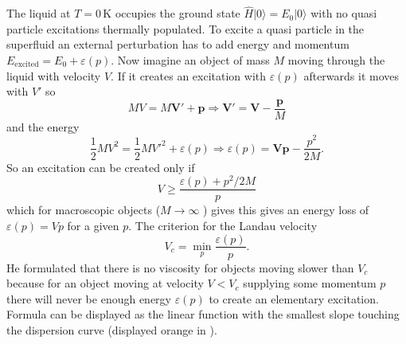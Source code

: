The liquid at $T = 0\, \mathrm{K}$ occupies the ground state $\hat H |0\rangle = E_0 |0\rangle$ with no quasi particle excitations thermally populated. To excite a quasi particle in the superfluid an external perturbation has to add energy and momentum $E_{\mathrm{excited}} = E_0 + \varepsilon(p)$. Now imagine an object of mass $M$ moving through the liquid with velocity $V$. If it creates an excitation with $\varepsilon(p)$ afterwards it moves with $V'$ so
\begin{equation}
    MV = M\mathbf V' + \mathbf p \Rightarrow \mathbf V' = \mathbf V -\frac{\mathbf p}{M}
\end{equation}
and the energy
\begin{equation}
    \frac{1}{2}MV^2 = \frac{1}{2}MV'^2 + \varepsilon(p) \Rightarrow \varepsilon(p) = \mathbf V\mathbf p - \frac{p^2}{2M}.
\end{equation}
So an excitation can be created only if 
\begin{equation}
    V \ge \frac{\varepsilon(p)+ p^2/2M}{p}
\end{equation}
which for macroscopic objects ($M \rightarrow \infty$ ) gives this gives an energy loss of $\varepsilon (p) = V p$ for a given $p$. The criterion for the Landau velocity
\begin{equation}
    V_c = \min_{p} \frac{\varepsilon(p)}{p}.
    \label{eq:landau_velocity}
\end{equation}
He formulated that there is no viscosity for objects moving slower than $V_c$ because for an object moving at velocity $V < V_c$ supplying some momentum $p$ there will never be enough energy $\varepsilon (p)$ to create an elementary excitation. Formula  can be displayed as the linear function with the smallest slope touching the dispersion curve (displayed orange in ).

